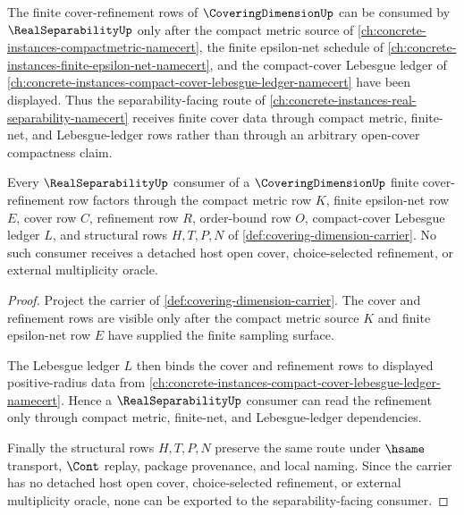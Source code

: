 The finite cover-refinement rows of $\CoveringDimensionUp$ can be consumed by $\RealSeparabilityUp$ only after the compact metric source of \autoref{ch:concrete-instances-compactmetric-namecert}, the finite epsilon-net schedule of \autoref{ch:concrete-instances-finite-epsilon-net-namecert}, and the compact-cover Lebesgue ledger of \autoref{ch:concrete-instances-compact-cover-lebesgue-ledger-namecert} have been displayed. Thus the separability-facing route of \autoref{ch:concrete-instances-real-separability-namecert} receives finite cover data through compact metric, finite-net, and Lebesgue-ledger rows rather than through an arbitrary open-cover compactness claim.

\begin{lemma}
\label{lem:covering-dimension-separability-cover-refinement-route}
Every $\RealSeparabilityUp$ consumer of a $\CoveringDimensionUp$ finite cover-refinement row factors through the compact metric row $K$, finite epsilon-net row $E$, cover row $C$, refinement row $R$, order-bound row $O$, compact-cover Lebesgue ledger $L$, and structural rows $H,T,P,N$ of \autoref{def:covering-dimension-carrier}. No such consumer receives a detached host open cover, choice-selected refinement, or external multiplicity oracle.
\end{lemma}
\begin{proof}
Project the carrier of \autoref{def:covering-dimension-carrier}. The cover and refinement rows are visible only after the compact metric source $K$ and finite epsilon-net row $E$ have supplied the finite sampling surface.

The Lebesgue ledger $L$ then binds the cover and refinement rows to displayed positive-radius data from \autoref{ch:concrete-instances-compact-cover-lebesgue-ledger-namecert}. Hence a $\RealSeparabilityUp$ consumer can read the refinement only through compact metric, finite-net, and Lebesgue-ledger dependencies.

Finally the structural rows $H,T,P,N$ preserve the same route under $\hsame$ transport, $\Cont$ replay, package provenance, and local naming. Since the carrier has no detached host open cover, choice-selected refinement, or external multiplicity oracle, none can be exported to the separability-facing consumer.
\end{proof}

